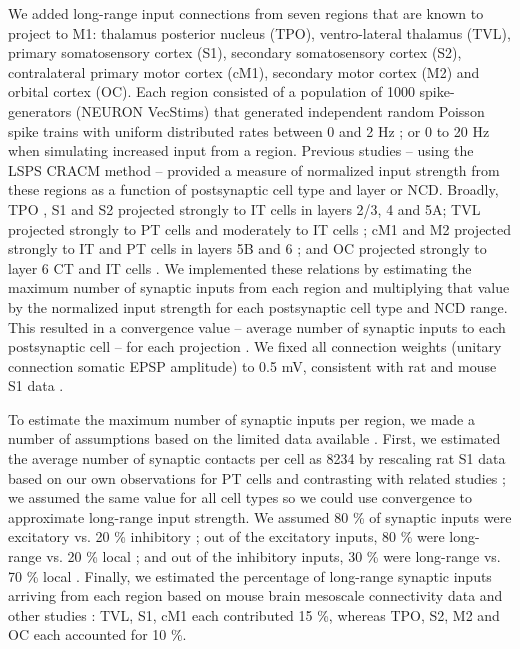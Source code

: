 We added long-range input connections from seven regions that are known to project to M1: thalamus posterior nucleus (TPO), ventro-lateral thalamus (TVL), primary somatosensory cortex (S1), secondary somatosensory cortex (S2), contralateral primary motor cortex (cM1), secondary motor cortex (M2) and orbital cortex (OC). Each region consisted of a population of 1000 \cite{Cons13,Brun06} spike-generators (NEURON VecStims) that generated independent random Poisson spike trains with uniform distributed rates between 0 and 2 Hz \cite{Yama13,Hira06}; or 0 to 20 Hz \cite{Isom09,Jaco12} when simulating increased input from a region. Previous studies -- using the LSPS CRACM method -- provided a measure of  normalized input strength from these regions as a function of postsynaptic cell type and layer or NCD. Broadly, TPO \cite{Yama15,Yama15b,Naka16}, S1 \cite{MaoK11} and S2 \cite{Sute15} projected strongly to IT cells in layers 2/3, 4 and 5A; TVL projected strongly to PT cells and moderately to IT cells \cite{Yama15,Yama15b,Naka16}; cM1 and M2 projected strongly to IT and PT cells in layers 5B and 6 \cite{Hook13}; and OC projected strongly to layer 6 CT and IT cells \cite{Hook13}. We implemented these relations by estimating the maximum number of synaptic inputs from each region and multiplying that value by the normalized input strength for each postsynaptic cell type and NCD range. This resulted in a convergence value -- average number of synaptic inputs to each postsynaptic cell -- for each projection . We fixed all connection weights (unitary connection somatic EPSP amplitude) to 0.5 mV, consistent with rat and mouse S1 data \cite{HuAg16,Cons13}.

To estimate the maximum number of synaptic inputs per region, we made a number of assumptions based on the limited data available . First, we estimated the average number of synaptic contacts per cell as 8234 by rescaling rat S1 data \cite{Meye10} based on our own observations for PT cells \cite{Sute13} and contrasting with related studies \cite{Schu89,DeFe02}; we assumed the same value for all cell types so we could use convergence to approximate long-range input strength. We assumed 80 \% of synaptic inputs were excitatory vs. 20 \% inhibitory \cite{DeFe02,Mark15}; out of the excitatory inputs, 80 \% were long-range vs. 20 \% local \cite{Mark15,Step09}; and out of the inhibitory inputs, 30 \% were long-range vs. 70 \% local \cite{Step09}. Finally, we estimated the percentage of long-range synaptic inputs arriving from each region based on mouse brain mesoscale connectivity data \cite{OhHa14} and other studies \cite{Meye10b,Brun06,Meye10,Zhan16,Bopp17}: TVL, S1, cM1 each contributed 15 \%, whereas TPO, S2, M2 and OC each accounted for 10 \%. 


